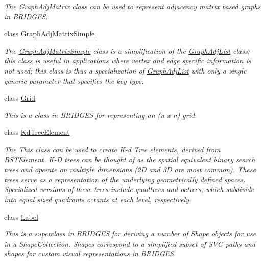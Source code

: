 \begin{DoxyCompactItemize}
\begin{DoxyCompactList}\small\item\em The \mbox{\hyperlink{classbridges_1_1base_1_1_graph_adj_matrix}{Graph\+Adj\+Matrix}} class can be used to represent adjacency matrix based graphs in B\+R\+I\+D\+G\+ES. \end{DoxyCompactList}\item 
class \mbox{\hyperlink{classbridges_1_1base_1_1_graph_adj_matrix_simple}{Graph\+Adj\+Matrix\+Simple}}
\begin{DoxyCompactList}\small\item\em The \mbox{\hyperlink{classbridges_1_1base_1_1_graph_adj_matrix_simple}{Graph\+Adj\+Matrix\+Simple}} class is a simplification of the \mbox{\hyperlink{classbridges_1_1base_1_1_graph_adj_list}{Graph\+Adj\+List}} class; this class is useful in applications where vertex and edge specific information is not used; this class is thus a specialization of \mbox{\hyperlink{classbridges_1_1base_1_1_graph_adj_list}{Graph\+Adj\+List}} with only a single generic parameter that specifies the key type. \end{DoxyCompactList}\item 
class \mbox{\hyperlink{classbridges_1_1base_1_1_grid}{Grid}}
\begin{DoxyCompactList}\small\item\em This is a class in B\+R\+I\+D\+G\+ES for representing an (n x n) grid. \end{DoxyCompactList}\item 
class \mbox{\hyperlink{classbridges_1_1base_1_1_kd_tree_element}{Kd\+Tree\+Element}}
\begin{DoxyCompactList}\small\item\em The This class can be used to create K-\/d Tree elements, derived from \mbox{\hyperlink{classbridges_1_1base_1_1_b_s_t_element}{B\+S\+T\+Element}}. K-\/D trees can be thought of as the spatial equivalent binary search trees and operate on multiple dimensions (2D and 3D are most common). These trees serve as a representation of the underlying geometrically defined spaces. Specialized versions of these trees include quadtrees and octrees, which subdivide into equal sized quadrants octants at each level, respectively. \end{DoxyCompactList}\item 
class \mbox{\hyperlink{classbridges_1_1base_1_1_label}{Label}}
\begin{DoxyCompactList}\small\item\em This is a superclass in B\+R\+I\+D\+G\+ES for deriving a number of Shape objects for use in a Shape\+Collection. Shapes correspond to a simplified subset of S\+VG paths and shapes for custom visual representations in B\+R\+I\+D\+G\+ES. \end{DoxyCompactList}\item 

\end{DoxyCompactItemize}
